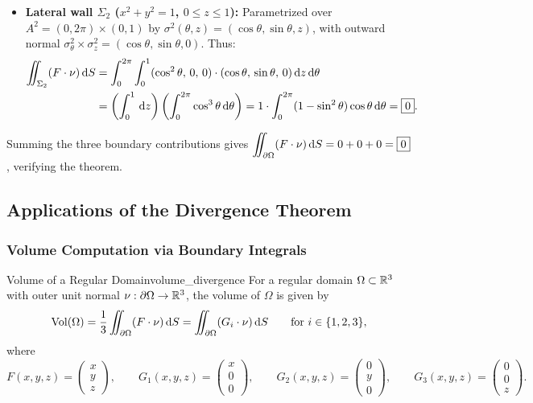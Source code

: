 \begin{exemple}
\begin{itemize}
    \item \textbf{Lateral wall $\Sigma_2$ ($x^2 + y^2 = 1$, $0 \le z \le 1$):} Parametrized over $A^2 = (0, 2\pi) \times (0, 1)$ by $\sigma^2(\theta, z) = (\cos\theta, \sin\theta, z)$, with outward normal $\sigma^2_\theta \times \sigma^2_z = (\cos\theta, \sin\theta, 0)$. Thus:
    \begin{align*}
        \iint_{\Sigma_2} (F \cdot \nu) \,\mathrm{d}S &= \int_{0}^{2\pi} \int_{0}^{1} (\cos^2\theta, \, 0, \, 0) \cdot (\cos\theta, \, \sin\theta, \, 0) \,\mathrm{d}z \,\mathrm{d}\theta \\
        &= \left( \int_{0}^{1} \,\mathrm{d}z \right) \left( \int_{0}^{2\pi} \cos^3\theta \,\mathrm{d}\theta \right) = 1 \cdot \int_{0}^{2\pi} (1 - \sin^2\theta)\cos\theta \,\mathrm{d}\theta = \boxed{0}.
    \end{align*}
\end{itemize}
Summing the three boundary contributions gives $\displaystyle\iint_{\partial\Omega} (F \cdot \nu) \,\mathrm{d}S = 0 + 0 + 0 = \boxed{0}$, verifying the theorem.
\end{exemple}

\subsection{Applications of the Divergence Theorem}

\subsubsection{Volume Computation via Boundary Integrals}

\begin{corollaire}{Volume of a Regular Domain}{volume_divergence}
For a regular domain $\Omega \subset \mathbb{R}^3$ with outer unit normal $\nu : \partial\Omega \to \mathbb{R}^3$, the volume of $\Omega$ is given by
\[
    \operatorname{Vol}(\Omega) = \frac{1}{3} \iint_{\partial\Omega} (F \cdot \nu) \,\mathrm{d}S = \iint_{\partial\Omega} (G_i \cdot \nu) \,\mathrm{d}S \qquad \text{for } i \in \{1, 2, 3\},
\]
where
\[
    F(x,y,z) = \begin{pmatrix} x \\ y \\ z \end{pmatrix}, \qquad
    G_1(x,y,z) = \begin{pmatrix} x \\ 0 \\ 0 \end{pmatrix}, \qquad
    G_2(x,y,z) = \begin{pmatrix} 0 \\ y \\ 0 \end{pmatrix}, \qquad
    G_3(x,y,z) = \begin{pmatrix} 0 \\ 0 \\ z \end{pmatrix}.
\]
\end{corollaire}

